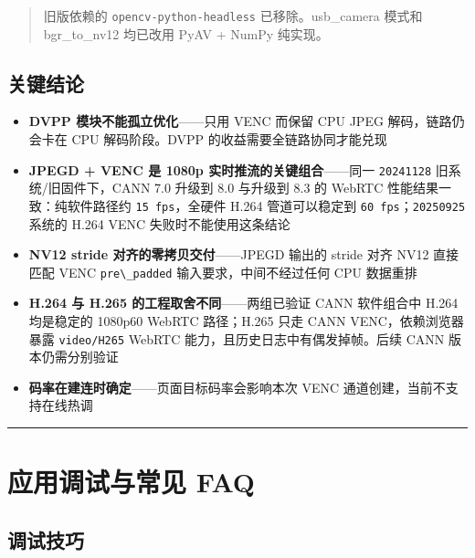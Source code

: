 \begin{quote}
旧版依赖的 \passthrough{\lstinline!opencv-python-headless!}
已移除。usb\_camera 模式和 bgr\_to\_nv12 均已改用 PyAV + NumPy 纯实现。
\end{quote}

\subsection{关键结论}\label{src-book-chapter6-h157}

\begin{itemize}
\tightlist
\item
  \textbf{DVPP 模块不能孤立优化}------只用 VENC 而保留 CPU JPEG
  解码，链路仍会卡在 CPU 解码阶段。DVPP 的收益需要全链路协同才能兑现
\item
  \textbf{JPEGD + VENC 是 1080p 实时推流的关键组合}------同一
  \passthrough{\lstinline!20241128!} 旧系统/旧固件下，CANN 7.0 升级到
  8.0 与升级到 8.3 的 WebRTC 性能结果一致：纯软件路径约
  \passthrough{\lstinline!15 fps!}，全硬件 H.264 管道可以稳定到
  \passthrough{\lstinline!60 fps!}；\passthrough{\lstinline!20250925!}
  系统的 H.264 VENC 失败时不能使用这条结论
\item
  \textbf{NV12 stride 对齐的零拷贝交付}------JPEGD 输出的 stride 对齐
  NV12 直接匹配 VENC \passthrough{\lstinline!pre\_padded!}
  输入要求，中间不经过任何 CPU 数据重排
\item
  \textbf{H.264 与 H.265 的工程取舍不同}------两组已验证 CANN 软件组合中
  H.264 均是稳定的 1080p60 WebRTC 路径；H.265 只走 CANN
  VENC，依赖浏览器暴露 \passthrough{\lstinline!video/H265!} WebRTC
  能力，且历史日志中有偶发掉帧。后续 CANN 版本仍需分别验证
\item
  \textbf{码率在建连时确定}------页面目标码率会影响本次 VENC
  通道创建，当前不支持在线热调
\end{itemize}

\begin{center}\rule{0.5\linewidth}{0.5pt}\end{center}

\section{应用调试与常见 FAQ}\label{src-book-chapter6-h158}

\subsection{调试技巧}\label{src-book-chapter6-h159}

